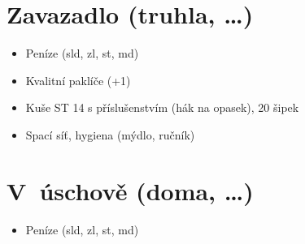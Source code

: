 \documentclass[11pt]{article}
\begin{document}
\vspace{4\baselineskip}

\section*{Zavazadlo (truhla, \ldots)}
\begin{itemize}
  \item Peníze (\hspace{1em}sld, \hspace{1em}zl, \hspace{1em}st, \hspace{1em}md)
  \item Kvalitní paklíče (+1)
  \item Kuše ST 14 s příslušenstvím (hák na opasek), 20 šipek
  \item Spací síť, hygiena (mýdlo, ručník)
\end{itemize}

\vspace{5\baselineskip}

\section*{V~úschově (doma, \ldots)}
\begin{itemize}
  \item Peníze (\hspace{1em}sld, \hspace{1em}zl, \hspace{1em}st, \hspace{1em}md)
\end{itemize}
\end{document}
